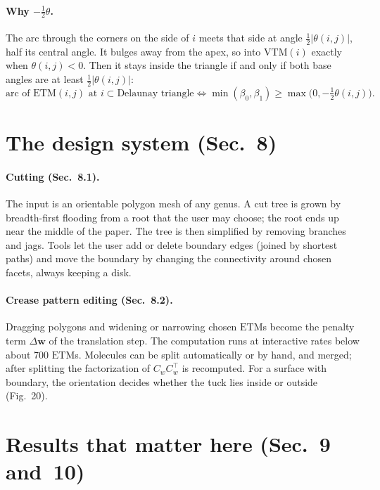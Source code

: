 \documentclass[11pt]{article}
\theoremstyle{definition}
\newcommand{\ETM}{\mathrm{ETM}}
\newcommand{\VTM}{\mathrm{VTM}}
\newcommand{\wv}{\mathbf{w}}
\begin{document}
\paragraph{Why $-\frac12\theta$.} The arc through the corners on the side of $i$
meets that side at angle $\frac12|\theta(i,j)|$, half its central angle. It
bulges away from the apex, so into $\VTM(i)$ exactly when $\theta(i,j) < 0$.
Then it stays inside the triangle if and only if both base angles are at least
$\frac12|\theta(i,j)|$:
\begin{equation}
  \text{arc of } \ETM(i,j) \text{ at } i \subset \text{Delaunay triangle}
  \iff \min(\beta_0, \beta_1) \ge \max\bigl(0, -\tfrac12\theta(i,j)\bigr).
  \label{eq:arc}
\end{equation}

\section{The design system (Sec.~8)}

\paragraph{Cutting (Sec.~8.1).} The input is an orientable polygon mesh of any
genus. A cut tree is grown by breadth-first flooding from a root that the user
may choose; the root ends up near the middle of the paper. The tree is then
simplified by removing branches and jags. Tools let the user add or delete
boundary edges (joined by shortest paths) and move the boundary by changing the
connectivity around chosen facets, always keeping a disk.

\paragraph{Crease pattern editing (Sec.~8.2).} Dragging polygons and widening or
narrowing chosen $\ETM$s become the penalty term $\Delta\wv$ of the translation
step. The computation runs at interactive rates below about 700 $\ETM$s.
Molecules can be split automatically or by hand, and merged; after splitting
the factorization of $C_w C_w^\top$ is recomputed. For a surface with boundary,
the orientation decides whether the tuck lies inside or outside (Fig.~20).

\section{Results that matter here (Sec.~9 and~10)}\label{sec:results}
\end{document}
